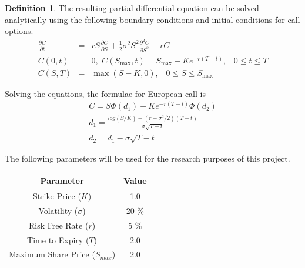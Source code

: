 \documentclass[12pt, oneside]{book}
\theoremstyle{plain}
\theoremstyle{definition}
\newtheorem{definition}[theorem]{Definition}
\begin{document}
\begin{definition}\label{bsAnal} The resulting partial differential equation can be solved analytically using the following boundary conditions and initial conditions for call options.
\begin{eqnarray}
\frac{\partial C}{\partial t} &=& rS\frac{\partial C}{\partial S}+\frac{1}{2} \sigma^2 S^2 \frac{\partial^2 C}{\partial S^2} - rC \\[10pt]
C(0,t) &=& 0, \hspace{4pt} C(S_{\max},t)=S_{\max} - K e^{-r(T-t)}, \hspace{10pt} 0 \leq t \leq T \\[10pt]
C(S,T) &=& \max(S-K,0), \hspace{10pt} 0 \leq S \leq S_{\max}
\end{eqnarray}

Solving the equations, the formulae \cite{wilmott} for European call is
\begin{eqnarray}
C = S \Phi (d_1) - K e^{-r(T-t)} \Phi (d_2) \\[10pt]
d_1 = \frac{log(S/K) + (r + \sigma^2/2)(T - t)}{\sigma \sqrt{T-t}} \\[10pt]
d_2 = d_1 - \sigma \sqrt{T-t}
\end{eqnarray}

The following parameters will be used for the research purposes of this project.
\begin{table}[h!]
\centering
 \begin{tabular}{||c c||} 
 \hline
 Parameter & Value\\ [0.5ex]
 \hline\hline
 Strike Price ($K$) & 1.0\\ 
 Volatility ($\sigma$) & 20 \% \\
 Risk Free Rate ($r$) & 5 \% \\
 Time to Expiry ($T$) & 2.0\\
 Maximum Share Price ($S_{max}$) & 2.0\\ [1ex] 
 \hline
 \end{tabular}
\end{table}


\end{definition}
\end{document}
